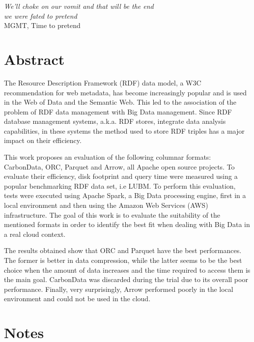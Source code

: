 \documentclass[10pt, a4paper]{report}
\begin{document}
\begin{flushright}
	\vspace*{2cm}
	\textit{
		We'll choke on our vomit and that will be the end\\
		we were fated to pretend\\
	}
	\vspace*{0.4cm}
	MGMT, Time to pretend
\end{flushright}
\clearpage

\chapter*{Abstract}

The Resource Description Framework (RDF) data model, a W3C recommendation for web metadata, has become increasingly popular and is used in the Web of Data and the Semantic Web. This led to the association of the problem of RDF data management with Big Data management. Since RDF database management systems, a.k.a. RDF stores, integrate data analysis capabilities, in these systems the method used to store RDF triples has a major impact on their efficiency.

This work proposes an evaluation of the following columnar formats: CarbonData, ORC, Parquet and Arrow, all Apache open source projects. To evaluate their efficiency, disk footprint and query time were measured using a popular benchmarking RDF data set, i.e LUBM. To perform this evaluation, tests were executed using Apache Spark, a Big Data processing engine, first in a local environment and then using the Amazon Web Services (AWS) infrastructure. The goal of this work is to evaluate the suitability of the mentioned formats in order to identify the best fit when dealing with Big Data in a real cloud context.

The results obtained show that ORC and Parquet have the best performances. The former is better in data compression, while the latter seems to be the best choice when the amount of data increases and the time required to access them is the main goal. CarbonData was discarded during the trial due to its overall poor performance. Finally, very surprisingly, Arrow performed poorly in the local environment and could not be used in the cloud.


\tableofcontents
\clearpage

\chapter*{Notes}
\end{document}
